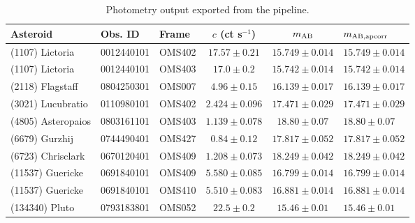 \begin{table}[t]
\centering
\scriptsize
\setlength{\tabcolsep}{3pt}
\renewcommand{\arraystretch}{1.03}
\begin{tabular}{lllcc}
Asteroid & Obs. ID & Frame & $c$ (ct s$^{-1}$) & $m_{\rm AB}$ & $m_{\rm AB,apcorr}$ \\
\midrule
(1107) Lictoria & 0012440101 & OMS402 & $17.57 \pm 0.21$ & $15.749 \pm 0.014$ & $15.749 \pm 0.014$ \\
(1107) Lictoria & 0012440101 & OMS403 & $17.0 \pm 0.2$ & $15.742 \pm 0.014$ & $15.742 \pm 0.014$ \\
(2118) Flagstaff & 0804250301 & OMS007 & $4.96 \pm 0.15$ & $16.139 \pm 0.017$ & $16.139 \pm 0.017$ \\
(3021) Lucubratio & 0110980101 & OMS402 & $2.424 \pm 0.096$ & $17.471 \pm 0.029$ & $17.471 \pm 0.029$ \\
(4805) Asteropaios & 0803161101 & OMS403 & $1.139 \pm 0.078$ & $18.80 \pm 0.07$ & $18.80 \pm 0.07$ \\
(6679) Gurzhij & 0744490401 & OMS427 & $0.84 \pm 0.12$ & $17.817 \pm 0.052$ & $17.817 \pm 0.052$ \\
(6723) Chrisclark & 0670120401 & OMS409 & $1.208 \pm 0.073$ & $18.249 \pm 0.042$ & $18.249 \pm 0.042$ \\
(11537) Guericke & 0691840101 & OMS409 & $5.580 \pm 0.085$ & $16.799 \pm 0.014$ & $16.799 \pm 0.014$ \\
(11537) Guericke & 0691840101 & OMS410 & $5.510 \pm 0.083$ & $16.881 \pm 0.014$ & $16.881 \pm 0.014$ \\
(134340) Pluto & 0793183801 & OMS052 & $22.5 \pm 0.2$ & $15.46 \pm 0.01$ & $15.46 \pm 0.01$ \\
\bottomrule
\end{tabular}
\caption{Photometry output exported from the pipeline.}
\label{tab:photometry_output}
\end{table}